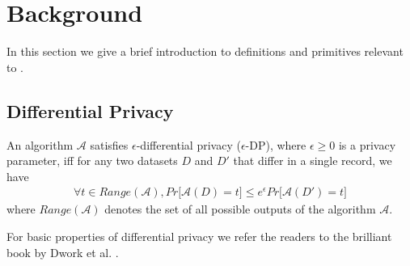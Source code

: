 
\section{Background}
In this section we give a brief introduction to definitions and primitives relevant to \system. 

\subsection{Differential Privacy}
\begin{definition} An algorithm $\mathcal{A}$
satisfies $\epsilon$-differential privacy ($\epsilon$-DP), where $\epsilon \geq 0$ is a privacy parameter, iff
 for any two datasets $D$ and $D'$ that differ in a single record, we have
\begin{gather}
\forall t \in Range(\mathcal{A}), Pr \big[\mathcal{A}(D) = t\big] \leq e^{\epsilon}Pr\big[\mathcal{A}(D') = t\big]
\end{gather}
where $Range(\mathcal{A})$ denotes the set of all possible outputs
of the algorithm $\mathcal{A}$.
\end{definition} 
For basic properties of differential privacy we refer the readers to the brilliant book by Dwork et al. \cite{Dork}.
